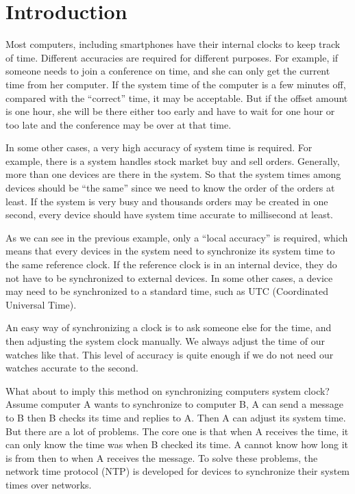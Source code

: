 

\chapter{Introduction}
Most computers, including smartphones have their internal clocks to keep track
of time. Different accuracies are required for different purposes. 
For example, if someone needs to join a conference on time, and she can
only get the current time from her computer. If the system time of the
computer is a few minutes off, compared with the ``correct'' time, it may be
acceptable. But if the offset amount is one hour, she will be there either too
early and have to wait for one hour or too late and the conference may be over
at that time.

In some other cases, a very high accuracy of system time is required. For
example, there is a system handles stock market buy and sell orders. Generally,
more than one devices are there in the system. So that the system times among
devices should be ``the same'' since we need to know the order of the orders at
least. If the system is very busy and thousands orders may be created in one
second, every device should have system time accurate to millisecond at least.

As we can see in the previous example, only a ``local accuracy'' is required,
which means that every devices in the system need to synchronize its system
time to the same reference clock. If the reference clock is in an internal
device, they do not have to be synchronized to external devices. In some other
cases, a device may need to be synchronized to a standard time, such as UTC
(Coordinated Universal Time).  

An easy way of synchronizing a clock is to ask someone else for the time, and
then adjusting the system clock manually. We always adjust the time of our
watches like that. This level of  accuracy is quite enough if we do not need
our watches accurate to the second. 

What about to imply this method on synchronizing computers system clock? Assume
computer A wants to synchronize to computer B, A can send a message to B then B
checks its time and replies to A\null. Then A can adjust its system time.  
But there are a lot of problems.  The core one is that when A receives
the time, it can only know the time was when B checked its time. A cannot know
how long it is from then to when A receives the message. To solve these
problems, the network time protocol (NTP) is developed for devices to
synchronize their system times over networks. 

